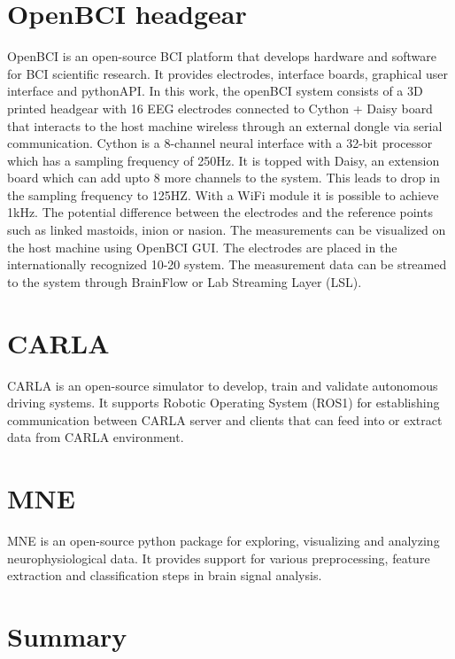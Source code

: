 \section{OpenBCI headgear}
OpenBCI is an open-source BCI platform that develops hardware and software for BCI scientific research. It provides electrodes, interface boards, graphical user interface 
and pythonAPI. In this work, the openBCI system consists of a 3D printed headgear with 16 EEG electrodes connected to Cython + Daisy board that interacts to the host machine wireless 
through an external dongle via 
serial communication. Cython is a 8-channel neural interface with a 32-bit processor which has a sampling frequency of 250Hz. It is topped with Daisy, an extension board which 
can add upto 8 more channels to the system. This leads to drop in the sampling frequency to 125HZ. With a WiFi module it is possible to achieve 1kHz.
The potential difference between the electrodes and the reference points such as 
linked mastoids, inion or nasion. The measurements can be visualized on the host machine using OpenBCI GUI. The electrodes are placed in the internationally recognized 10-20 system.
The measurement data can be streamed to the system through BrainFlow or Lab Streaming Layer (LSL). 

\section{CARLA}
CARLA is an open-source simulator to develop, train and validate autonomous driving systems. It supports Robotic Operating System (ROS1) for establishing communication between CARLA
server and clients that can feed into or extract data from CARLA environment.

\section{MNE}
MNE is an open-source python package for exploring, visualizing and analyzing neurophysiological data. It provides support for various preprocessing, feature extraction and classification
steps in brain signal analysis.

\section*{Summary} 